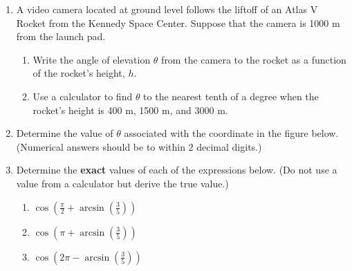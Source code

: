 \begin{enumerate}
  \vfill

\item A video camera located at ground level follows the liftoff of an
  Atlas V Rocket from the Kennedy Space Center.  Suppose that the
  camera is 1000 m from the launch pad.
\begin{enumerate}
\item Write the angle of elevation $\theta$ from the camera to the
  rocket as a function of the rocket's height, $h$.
  
  \vfill
  
\item Use a calculator to find $\theta$ to the nearest tenth of a
  degree when the rocket's height is 400 m, 1500 m, and 3000 m.
  
  \vfill
\end{enumerate}

\clearpage
\item Determine the value of $\theta$ associated with the coordinate
      in the figure below. (Numerical answers should be to within 2
      decimal digits.)


\item Determine the \textbf{exact} values of each of the
  expressions below. (Do not use a value from a calculator but derive the true value.)
  \begin{enumerate}


  \item
    ${\displaystyle \cos\left(\frac{\pi}{2} + \arcsin\left(\frac{3}{5}\right) \right) }$ 
    \vfill
    
   \item
    ${\displaystyle \cos\left(\pi + \arcsin\left(\frac{3}{5}\right) \right) }$ 
    \vfill
    
      \item
    ${\displaystyle \cos\left(2\pi - \arcsin\left(\frac{3}{5}\right) \right) }$ 
    \vfill   
    


  \end{enumerate}

\end{enumerate}

